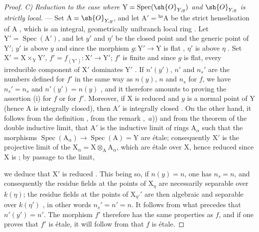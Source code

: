 \begin{proof}
\emph{C) Reduction to the case where $\mathrm{Y}=\operatorname{Spec}(\sh{O}_{Y,y})$ and $\sh{O}_{Y,y}$ is strictly local.} ---
Set $\mathrm{A}=\sh{O}_{Y,y}$, and let $\mathrm{A}'={}^{\mathrm{hs}}\mathrm{A}$ be the strict henselisation of $\mathrm{A}$ , which is an integral, geometrically unibranch local ring .
Let $\mathrm{Y}'=\operatorname{Spec}(\mathrm{A}')$, and let $y'$ and $\eta'$ be the closed point and the generic point of $\mathrm{Y}'$; $y'$ is above $y$ and since the morphism $g:\mathrm{Y}'\to\mathrm{Y}$ is flat , $\eta'$ is above $\eta$ .
Set $\mathrm{X}'=\mathrm{X}\times_{\mathrm{Y}}\mathrm{Y}'$, $f'=f_{(\mathrm{Y}')}:\mathrm{X}'\to\mathrm{Y}'$; $f'$ is finite and since $g$ is flat, every irreducible component of $\mathrm{X}'$ dominates $\mathrm{Y}'$ .
If $n'(y')$, $n'$ and $n_s'$ are the numbers defined for $f'$ in the same way as $n(y)$, $n$ and $n_s$ for $f$, we have $n_s'=n_s$ and $n'(y')=n(y)$ , and it therefore amounts to proving the assertion (i) for $f$ or for $f'$.
Moreover, if $\mathrm{X}$ is reduced and $y$ is a normal point of $\mathrm{Y}$ (hence $\mathrm{A}$ is integrally closed), then $\mathrm{A}'$ is integrally closed .
On the other hand, it follows from the definition , from the remark ,~$a$)) and from the theorem of the double inductive limit, that $\mathrm{A}'$ is the inductive limit of rings $\mathrm{A}_\alpha$ such that the morphisms $\operatorname{Spec}(\mathrm{A}_\alpha)\to\operatorname{Spec}(\mathrm{A})=\mathrm{Y}$ are \'etale; consequently $\mathrm{X}'$ is the projective limit of the $\mathrm{X}_\alpha=\mathrm{X}\otimes_{\mathrm{A}}\mathrm{A}_\alpha$, which are \'etale over $\mathrm{X}$, hence reduced since $\mathrm{X}$ is ; by passage to the limit,


we deduce that $\mathrm{X}'$ is reduced .
This being so, if $n(y)=n$, one has $n_s=n$, and consequently the residue fields at the points of $\mathrm{X}_\eta$ are necessarily separable over $k(\eta)$; the residue fields at the points of $\mathrm{X}_{\eta'}'$ are then algebraic and separable over $k(\eta')$ , in other words $n_s'=n'=n$. It follows from what precedes that $n'(y')=n'$.
The morphism $f'$ therefore has the same properties as $f$, and if one proves that $f'$ is \'etale, it will follow from  that $f$ is \'etale.


\end{proof}
